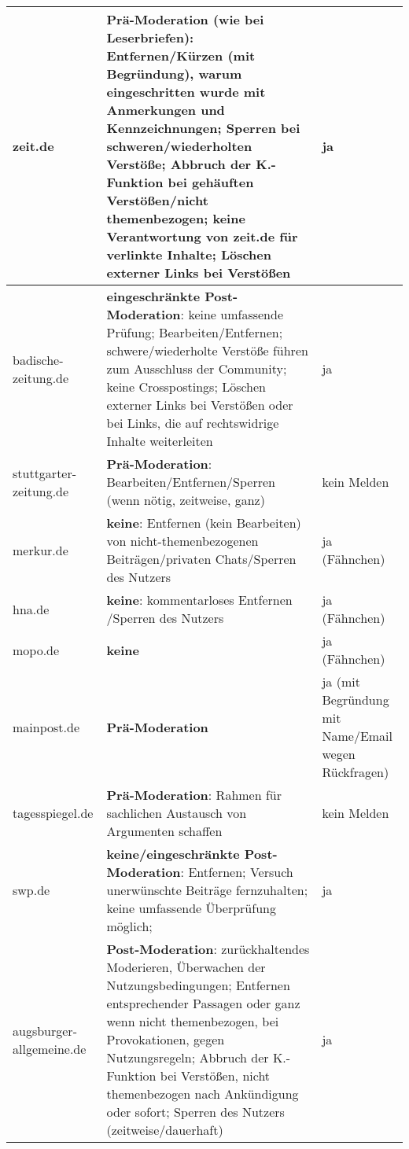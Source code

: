 \begin{landscape}
\begin{longtable}{lp{110mm}p{50mm}}
zeit.de &
   {\bfseries Prä-Moderation} (wie bei Leserbriefen): Entfernen/Kürzen (mit Begründung),
  warum eingeschritten wurde mit Anmerkungen und Kennzeichnungen; Sperren bei
  schweren/wiederholten Verstöße; Abbruch der K.-Funktion bei gehäuften
  Verstößen/nicht themenbezogen; keine Verantwortung von zeit.de für verlinkte
  Inhalte; Löschen externer Links bei Verstößen &
  ja \\\midrule

badische-zeitung.de &
   {\bfseries eingeschränkte Post-Moderation}: keine umfassende Prüfung;
  Bearbeiten/Entfernen; schwere/wiederholte Verstöße führen zum Ausschluss der
  Community; keine Crosspostings; Löschen externer Links bei Verstößen oder bei
  Links, die auf rechtswidrige Inhalte weiterleiten &
  ja \\\midrule

stuttgarter-zeitung.de &
  {\bfseries Prä-Moderation}: Bearbeiten/Entfernen/Sperren (wenn nötig, zeitweise, ganz) &
  kein Melden\\\midrule

merkur.de &
   {\bfseries keine}: Entfernen (kein Bearbeiten) von nicht-themenbezogenen
  Beiträgen/privaten Chats/Sperren des Nutzers &
  ja (Fähnchen) \\\midrule

hna.de &
   {\bfseries keine}: kommentarloses Entfernen /Sperren des Nutzers &
  ja (Fähnchen) \\\midrule

mopo.de &
   {\bfseries keine} &
  ja (Fähnchen) \\\midrule

mainpost.de &
   {\bfseries Prä-Moderation} &
  ja (mit Begründung mit Name/Email wegen Rückfragen) \\\midrule

tagesspiegel.de &
   {\bfseries Prä-Moderation}: Rahmen für sachlichen Austausch von Argumenten schaffen &
  kein Melden \\\midrule

swp.de &
   {\bfseries keine/eingeschränkte Post-Moderation}: Entfernen; Versuch unerwünschte
  Beiträge fernzuhalten; keine umfassende Überprüfung möglich; &
  ja \\\midrule

augsburger-allgemeine.de &
   {\bfseries Post-Moderation}: zurückhaltendes Moderieren, Überwachen der
  Nutzungsbedingungen; Entfernen entsprechender Passagen oder ganz wenn nicht
  themenbezogen, bei Provokationen, gegen Nutzungsregeln; Abbruch der
  K.-Funktion bei Verstößen, nicht themenbezogen nach Ankündigung oder sofort;
  Sperren  des Nutzers (zeitweise/dauerhaft) &
  ja \\

\end{longtable}
\end{landscape}

